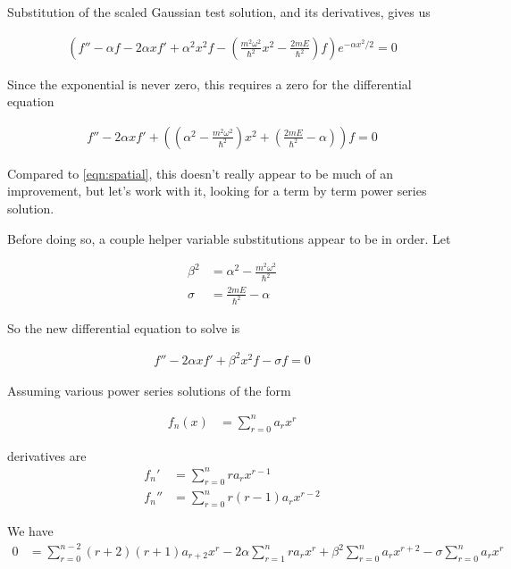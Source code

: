 \documentclass{article}
\begin{document}
Substitution of the scaled Gaussian test solution, and its derivatives, gives us

\begin{align*}
\left( f'' - \alpha f - 2 \alpha x f' + \alpha^2 x^2 f - \left( \frac{m^2 \omega^2}{\hbar^2} x^2 - \frac{2 m E}{\hbar^2} \right) f \right) e^{ -\alpha x^2 /2} = 0
\end{align*}

Since the exponential is never zero, this requires a zero for the differential equation

\begin{align}
f'' - 2 \alpha x f' + \left( \left(\alpha^2 - \frac{m^2 \omega^2}{\hbar^2} \right) x^2 + \left(\frac{2 m E}{\hbar^2} - \alpha \right) \right) f = 0
\end{align}

Compared to \ref{eqn:spatial}, this doesn't really appear to be much of an improvement, but let's work with it, looking for a term by term power series solution.

Before doing so, a couple helper variable substitutions appear to be in order.  Let

\begin{align*}
\beta^2 &= \alpha^2 - \frac{m^2 \omega^2}{\hbar^2}  \\
\sigma &= \frac{2 m E}{\hbar^2} - \alpha 
\end{align*}

So the new differential equation to solve is

\begin{align}
f'' - 2 \alpha x f' + \beta^2 x^2 f - \sigma f = 0
\end{align}

Assuming various power series solutions of the form

\begin{align*}
f_n(x) &= \sum_{r=0}^n a_r x^r
\end{align*}

derivatives are
\begin{align*}
f_n' &= \sum_{r=0}^n r a_r x^{r-1} \\
f_n'' &= \sum_{r=0}^n r(r-1) a_r x^{r-2}
\end{align*}

We have 
\begin{align*}
0 &= \sum_{r=0}^{n-2} (r+2)(r+1) a_{r+2} x^{r}
 - 2 \alpha \sum_{r=1}^n r a_r x^{r}
+ \beta^2
\sum_{r=0}^n a_r x^{r+2} 
- \sigma \sum_{r=0}^n a_r x^r
\end{align*}
\end{document}

